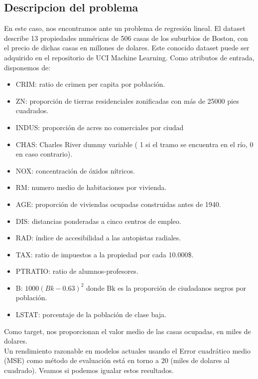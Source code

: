 \clearpage
{}
\subsection{Descripcion del problema}
En este caso, nos encontramos ante un problema de regresión lineal. El dataset describe 13 propiedades numéricas de 506 casas de los suburbios de Boston, con el precio de dichas casas en millones de dolares. Este conocido dataset puede ser adquirido en el repositorio de UCI Machine Learning. Como atributos de entrada, disponemos de:
\begin{itemize}[noitemsep]
\item CRIM: ratio de crimen per capita por población.
\item ZN: proporción de tierras residenciales zonificadas con más de 25000 pies cuadrados.
\item INDUS: proporción de acres no comerciales por ciudad
\item CHAS: Charles River dummy variable ( 1 si el tramo se encuentra en el río, 0 en caso contrario).
\item NOX: concentración de óxidos nítricos.
\item RM: numero medio de habitaciones por vivienda.
\item AGE: proporción de viviendas ocupadas construidas antes de 1940.
\item DIS: distancias ponderadas a cinco centros de empleo.
\item RAD: índice de accesibilidad a las autopistas radiales.
\item TAX: ratio de impuestos a la propiedad por cada 10.000\$.
\item PTRATIO: ratio de alumnos-profesores.
\item B: ${1000(Bk - 0.63)^2}$ donde Bk es la proporción de ciudadanos negros por población.
\item LSTAT: porcentaje de la población de clase baja.
\end{itemize}
Como target, nos proporcionan el valor medio de las casas ocupadas, en miles de dolares.\\
Un rendimiento razonable en modelos actuales usando el Error cuadrático medio (MSE) como método de evaluación está en torno a 20 (miles de dolares al cuadrado). Veamos si podemos igualar estos resultados.
